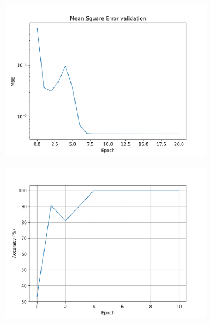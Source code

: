 \documentclass{article}
\begin{document}
\begin{figure}[hbt]
    \centering
    \begin{subfigure}[b]{0.33\textwidth}
        \centering 
        \includegraphics[width=\textwidth,trim={0 0 0 1.2cm},clip]{std_mimic_mse_validation.png}
        \caption{}
        \label{fig:std-mimic-validation}
    \end{subfigure}
    \hfill
    \begin{subfigure}[b]{0.33\textwidth}
        \centering 
        \includegraphics[width=\textwidth]{std_bars_accuracy.png} \caption{}
        \label{fig:std-bars-validation}
    \end{subfigure}
    \hfill
    \begin{subfigure}[b]{0.33\textwidth}

\end{subfigure}
\end{figure}
\end{document}
